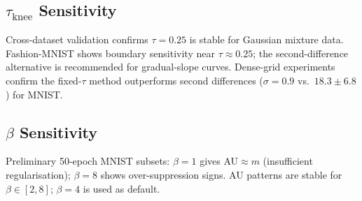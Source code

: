 \documentclass[11pt,a4paper]{article}
\begin{document}
\subsection{$\tau_{\mathrm{knee}}$ Sensitivity}\label{app:tau_knee}

Cross-dataset validation confirms $\tau=0.25$ is stable for Gaussian
mixture data.  Fashion-MNIST shows boundary sensitivity near $\tau\approx0.25$;
the second-difference alternative is recommended for gradual-slope curves.
Dense-grid experiments confirm the fixed-$\tau$ method outperforms second
differences ($\sigma=0.9$ vs.\ $18.3\pm6.8$) for MNIST.

\subsection{$\beta$ Sensitivity}\label{app:beta}
Preliminary 50-epoch MNIST subsets: $\beta=1$ gives AU$\approx m$
(insufficient regularisation); $\beta=8$ shows over-suppression signs.
AU patterns are stable for $\beta\in[2,8]$; $\beta=4$ is used as default.
\end{document}
